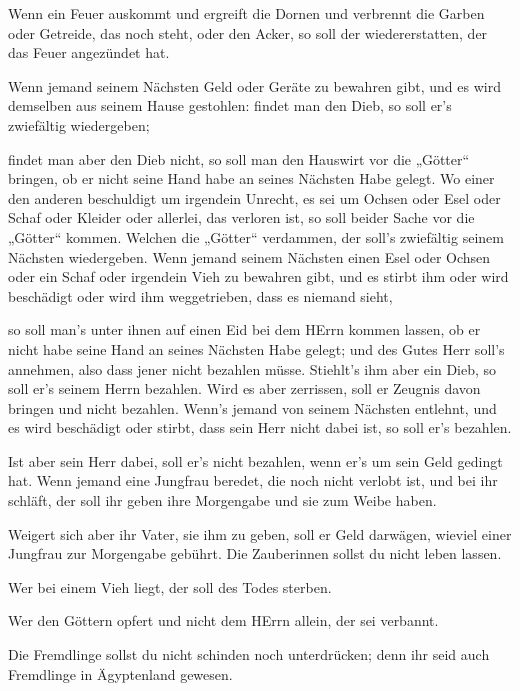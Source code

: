  Wenn ein Feuer auskommt und ergreift die Dornen und
verbrennt die Garben oder Getreide, das noch steht, oder den Acker, so
soll der wiedererstatten, der das Feuer angezündet hat.

 Wenn jemand seinem Nächsten Geld oder Geräte zu bewahren
gibt, und es wird demselben aus seinem Hause gestohlen: findet man den
Dieb, so soll er's zwiefältig wiedergeben;

 findet man aber den Dieb nicht, so soll man den Hauswirt
vor die „Götter`` bringen, ob er nicht seine Hand habe an seines
Nächsten Habe gelegt.  Wo einer den anderen beschuldigt um
irgendein Unrecht, es sei um Ochsen oder Esel oder Schaf oder Kleider
oder allerlei, das verloren ist, so soll beider Sache vor die „Götter``
kommen. Welchen die „Götter`` verdammen, der soll's zwiefältig seinem
Nächsten wiedergeben.  Wenn jemand seinem Nächsten einen
Esel oder Ochsen oder ein Schaf oder irgendein Vieh zu bewahren gibt,
und es stirbt ihm oder wird beschädigt oder wird ihm weggetrieben, dass
es niemand sieht,

 so soll man's unter ihnen auf einen Eid bei dem HErrn
kommen lassen, ob er nicht habe seine Hand an seines Nächsten Habe
gelegt; und des Gutes Herr soll's annehmen, also dass jener nicht
bezahlen müsse.  Stiehlt's ihm aber ein Dieb, so soll er's
seinem Herrn bezahlen.  Wird es aber zerrissen, soll er
Zeugnis davon bringen und nicht bezahlen.  Wenn's jemand
von seinem Nächsten entlehnt, und es wird beschädigt oder stirbt, dass
sein Herr nicht dabei ist, so soll er's bezahlen.

 Ist aber sein Herr dabei, soll er's nicht bezahlen, wenn
er's um sein Geld gedingt hat.  Wenn jemand eine Jungfrau
beredet, die noch nicht verlobt ist, und bei ihr schläft, der soll ihr
geben ihre Morgengabe und sie zum Weibe haben.

 Weigert sich aber ihr Vater, sie ihm zu geben, soll er
Geld darwägen, wieviel einer Jungfrau zur Morgengabe gebührt.
 Die Zauberinnen sollst du nicht leben lassen.

 Wer bei einem Vieh liegt, der soll des Todes sterben.

 Wer den Göttern opfert und nicht dem HErrn allein, der sei
verbannt.

 Die Fremdlinge sollst du nicht schinden noch unterdrücken;
denn ihr seid auch Fremdlinge in Ägyptenland gewesen.

